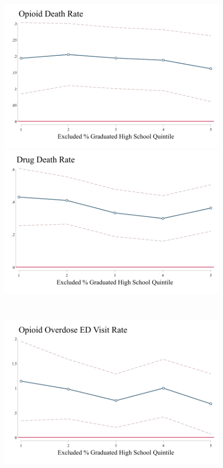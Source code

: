 \documentclass[12pt]{article}
\begin{document}
		\newpage
		\FloatBarrier
		\begin{figure}[h]
			\begin{minipage}[c]{0.48\linewidth}
				\centering
				\includegraphics[width=\linewidth]{../results/appendix/figures/opioid_by_hs_quintile.pdf}
			  	\includegraphics[width=\linewidth]{../results/appendix/figures/drug_by_hs_quintile.pdf}
			\end{minipage}
			~
			\hspace{0.05cm}
			\begin{minipage}[c]{0.48\linewidth}\centering
			  \centering
			  \includegraphics[width=\linewidth]{../results/appendix/figures/op_ovr_by_hs_quintile.pdf}

\end{minipage}
\end{figure}
\end{document}
